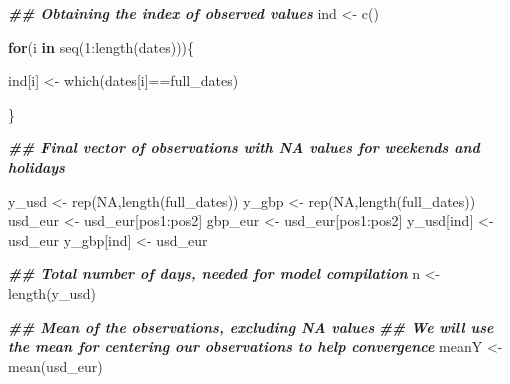 \documentclass[
]{article}
\newenvironment{Shaded}{\begin{snugshade}}{\end{snugshade}}
\newcommand{\ConstantTok}[1]{\textcolor[rgb]{0.00,0.00,0.00}{#1}}
\newcommand{\ControlFlowTok}[1]{\textcolor[rgb]{0.13,0.29,0.53}{\textbf{#1}}}
\newcommand{\DecValTok}[1]{\textcolor[rgb]{0.00,0.00,0.81}{#1}}
\newcommand{\DocumentationTok}[1]{\textcolor[rgb]{0.56,0.35,0.01}{\textbf{\textit{#1}}}}
\newcommand{\FunctionTok}[1]{\textcolor[rgb]{0.00,0.00,0.00}{#1}}
\newcommand{\NormalTok}[1]{#1}
\newcommand{\OtherTok}[1]{\textcolor[rgb]{0.56,0.35,0.01}{#1}}
\newcommand{\SpecialCharTok}[1]{\textcolor[rgb]{0.00,0.00,0.00}{#1}}
\begin{document}
\begin{Shaded}
\begin{Highlighting}[]
\DocumentationTok{\#\# Obtaining the index of observed values}
\NormalTok{ind }\OtherTok{\textless{}{-}} \FunctionTok{c}\NormalTok{()}

\ControlFlowTok{for}\NormalTok{(i }\ControlFlowTok{in} \FunctionTok{seq}\NormalTok{(}\DecValTok{1}\SpecialCharTok{:}\FunctionTok{length}\NormalTok{(dates)))\{}
  
\NormalTok{  ind[i] }\OtherTok{\textless{}{-}} \FunctionTok{which}\NormalTok{(dates[i]}\SpecialCharTok{==}\NormalTok{full\_dates)}
  
\NormalTok{\}}

\DocumentationTok{\#\# Final vector of observations with NA values for weekends and holidays}

\NormalTok{y\_usd }\OtherTok{\textless{}{-}} \FunctionTok{rep}\NormalTok{(}\ConstantTok{NA}\NormalTok{,}\FunctionTok{length}\NormalTok{(full\_dates))}
\NormalTok{y\_gbp }\OtherTok{\textless{}{-}} \FunctionTok{rep}\NormalTok{(}\ConstantTok{NA}\NormalTok{,}\FunctionTok{length}\NormalTok{(full\_dates))}
\NormalTok{usd\_eur }\OtherTok{\textless{}{-}}\NormalTok{ usd\_eur[pos1}\SpecialCharTok{:}\NormalTok{pos2]}
\NormalTok{gbp\_eur }\OtherTok{\textless{}{-}}\NormalTok{ usd\_eur[pos1}\SpecialCharTok{:}\NormalTok{pos2]}
\NormalTok{y\_usd[ind] }\OtherTok{\textless{}{-}}\NormalTok{ usd\_eur}
\NormalTok{y\_gbp[ind] }\OtherTok{\textless{}{-}}\NormalTok{ usd\_eur}


\DocumentationTok{\#\# Total number of days, needed for model compilation}
\NormalTok{n }\OtherTok{\textless{}{-}} \FunctionTok{length}\NormalTok{(y\_usd)}

\DocumentationTok{\#\# Mean of the observations, excluding NA values}
\DocumentationTok{\#\# We will use the mean for centering our observations to help convergence}
\NormalTok{meanY }\OtherTok{\textless{}{-}} \FunctionTok{mean}\NormalTok{(usd\_eur)}
\end{Highlighting}
\end{Shaded}
\end{document}
